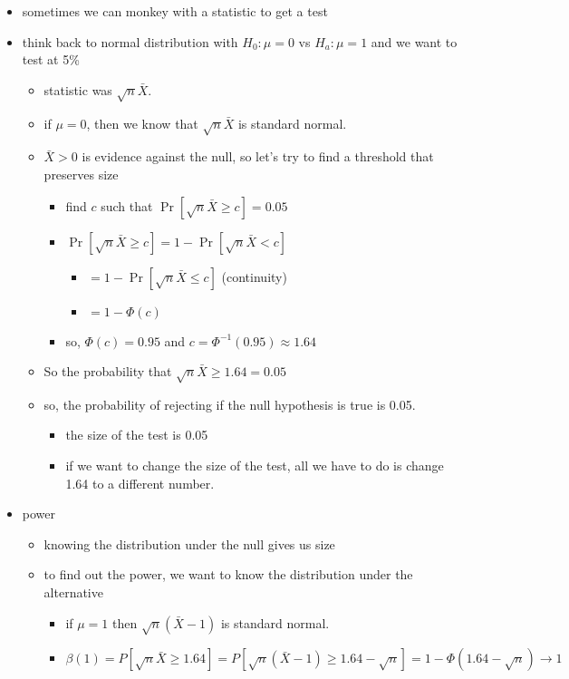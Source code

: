 \begin{itemize}
\item sometimes we can monkey with a statistic to get a test
\item think back to normal distribution with $H_0: \mu = 0$ vs
       $H_a: \mu = 1$ and we want to test at 5\%
\begin{itemize}
\item statistic was $\sqrt{n} \bar X$.
\item if $\mu = 0$, then we know that $\sqrt{n} \bar X$ is standard normal.
\item $\bar X > 0$ is evidence against the null, so let's try to
         find a threshold that preserves size
\begin{itemize}
\item find $c$ such that $\Pr[\sqrt{n} \bar X \geq c] = 0.05$
\item $\Pr[\sqrt{n} \bar X \geq c] = 1 - \Pr[\sqrt{n} \bar X < c]$
\begin{itemize}
\item $= 1 - \Pr[\sqrt{n} \bar X \leq c]$ (continuity)
\item $= 1 - \Phi(c)$
\end{itemize}
\item so, $\Phi(c) = 0.95$ and $c = \Phi^{-1}(0.95) \approx 1.64$
\end{itemize}
\item So the probability that $\sqrt{n} \bar X \geq 1.64 = 0.05$
\item so, the probability of rejecting if the null hypothesis is
         true is 0.05.
\begin{itemize}
\item the size of the test is 0.05
\item if we want to change the size of the test, all we have to
           do is change 1.64 to a different number.
\end{itemize}
\end{itemize}
\item power
\begin{itemize}
\item knowing the distribution under the null gives us size
\item to find out the power, we want to know the distribution under
         the alternative
\begin{itemize}
\item if $\mu = 1$ then $\sqrt{n}(\bar X - 1)$ is standard normal.
\item $\beta(1) = P[\sqrt{n} \bar X \geq 1.64] = P[\sqrt{n}(\bar
           X - 1) \geq 1.64 - \sqrt{n}] = 1 - \Phi(1.64 - \sqrt{n}) \to 1$
\end{itemize}
\end{itemize}
\end{itemize}

